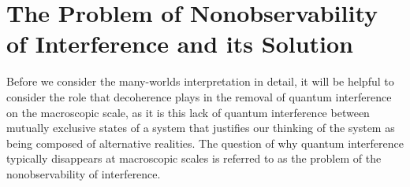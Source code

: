  
    \section{\label{Nonobservability} The Problem of Nonobservability of  Interference and its Solution\protect\footnotemark}Before we consider the many-worlds interpretation in detail, it will be helpful to consider the role that decoherence plays in the removal of quantum interference on the macroscopic scale, as it is this lack of quantum  interference between mutually exclusive states of a system that justifies our thinking of the system as being composed of alternative realities. The question of why quantum interference typically disappears at macroscopic scales is referred to as the problem of the nonobservability of interference. 
    
